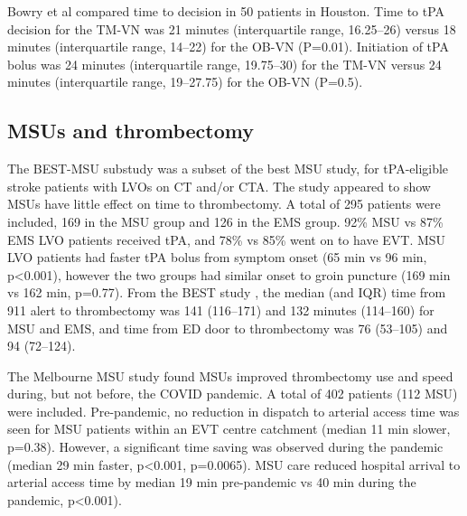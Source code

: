 Bowry et al \cite{bowry_time_2018} compared time to decision in 50 patients in Houston. Time to tPA decision for the TM-VN was 21 minutes (interquartile range, 16.25–26) versus 18 minutes (interquartile range, 14–22) for the OB-VN (P=0.01). Initiation of tPA bolus was 24 minutes (interquartile range, 19.75–30) for the TM-VN versus 24 minutes (interquartile range, 19–27.75) for the OB-VN (P=0.5).


\subsection{MSUs and thrombectomy}

The BEST-MSU substudy \cite{czap_abstract_2022} was a subset of the best MSU study, for tPA-eligible stroke patients with LVOs on CT and/or CTA. The study appeared to show MSUs have little effect on time to thrombectomy. A total of 295 patients were included, 169 in the MSU group and 126 in the EMS group. 92\% MSU vs 87\% EMS LVO patients received tPA, and 78\% vs 85\% went on to have EVT. MSU LVO patients had faster tPA bolus from symptom onset (65 min vs 96 min, p<0.001), however the two groups had similar onset to groin puncture (169 min vs 162 min, p=0.77). From the BEST study \cite{grotta_prospective_2021}, the median (and IQR) time from 911 alert to  thrombectomy was 141 (116–171) and 132 minutes (114–160) for MSU and EMS, and  time from ED door to thrombectomy was 76 (53–105) and 94 (72–124).


The Melbourne MSU study \cite{menezes_abstract_2023} found MSUs improved thrombectomy use and speed during, but not before, the COVID pandemic. A total of 402 patients (112 MSU) were included. Pre-pandemic, no reduction in dispatch to arterial access time was seen for MSU patients within an EVT centre catchment (median 11 min slower, p=0.38). However, a significant time saving was observed during the pandemic (median 29 min faster, p<0.001, p=0.0065). MSU care reduced hospital arrival to arterial access time by median 19 min pre-pandemic vs 40 min during the pandemic, p<0.001).

